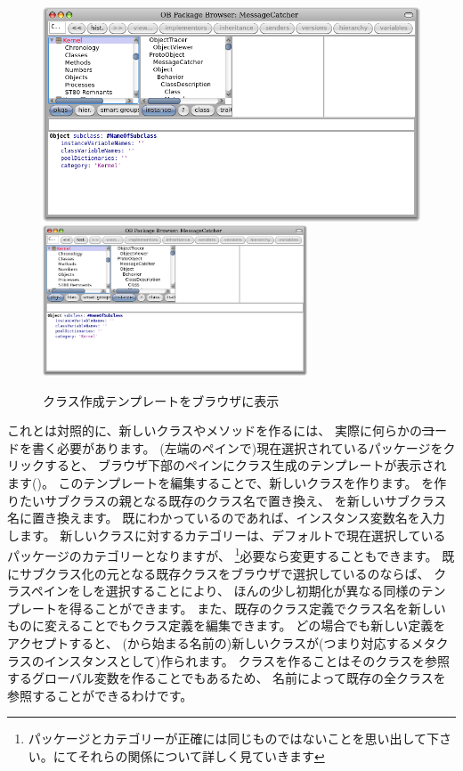 \documentclass[a4paper,10pt,twoside]{book}
\begin{document}
\begin{figure}[htbp]
   \centering
   \ifluluelse
{\includegraphics[width=\textwidth]{SystemBrowserClassCreation}}
{\includegraphics[width=0.7\textwidth]{SystemBrowserClassCreation}}
   \caption{クラス作成テンプレートをブラウザに表示
   }
\end{figure}

これとは対照的に、新しいクラスやメソッドを作るには、
実際に何らかの\st コードを書く必要があります。
(左端のペインで)現在選択されているパッケージをクリックすると、
ブラウザ下部のペインにクラス生成のテンプレートが表示されます()。
このテンプレートを編集することで、新しいクラスを作ります。
を作りたいサブクラスの親となる既存のクラス名で置き換え、
を新しいサブクラス名に置き換えます。
既にわかっているのであれば、インスタンス変数名を入力します。
新しいクラスに対するカテゴリーは、デフォルトで現在選択しているパッケージのカテゴリーとなりますが、
\footnote{パッケージとカテゴリーが正確には同じものではないことを思い出して下さい。にてそれらの関係について詳しく見ていきます}必要なら変更することもできます。
既にサブクラス化の元となる既存クラスをブラウザで選択しているのならば、
クラスペインを\actclick しを選択することにより、
ほんの少し初期化が異なる同様のテンプレートを得ることができます。
また、既存のクラス定義でクラス名を新しいものに変えることでもクラス定義を編集できます。
どの場合でも新しい定義をアクセプトすると、
(\ct{#}から始まる名前の)新しいクラスが(つまり対応するメタクラスのインスタンスとして)作られます。
クラスを作ることはそのクラスを参照するグローバル変数を作ることでもあるため、
名前によって既存の全クラスを参照することができるわけです。
\end{document}
